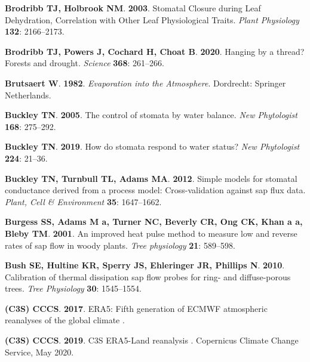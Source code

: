 \documentclass[11pt,twoside]{reedthesis}
\begin{document}
\hypertarget{ref-brodribb_stomatal_2003}{}
\textbf{\textnormal{Brodribb TJ}, \textnormal{Holbrook NM}}.
\textbf{2003}. Stomatal Closure during Leaf Dehydration, Correlation
with Other Leaf Physiological Traits. \emph{Plant Physiology}
\textbf{132}: 2166--2173.

\hypertarget{ref-Brodribb2020}{}
\textbf{\textnormal{Brodribb TJ}, \textnormal{Powers J},
\textnormal{Cochard H}, \textnormal{Choat B}}. \textbf{2020}. Hanging by
a thread? Forests and drought. \emph{Science} \textbf{368}: 261--266.

\hypertarget{ref-brutsaert_evaporation_1982}{}
\textbf{\textnormal{Brutsaert W}}. \textbf{1982}. \emph{Evaporation into
the Atmosphere}. Dordrecht: Springer Netherlands.

\hypertarget{ref-Buckley2005}{}
\textbf{\textnormal{Buckley TN}}. \textbf{2005}. The control of stomata
by water balance. \emph{New Phytologist} \textbf{168}: 275--292.

\hypertarget{ref-Buckley2019}{}
\textbf{\textnormal{Buckley TN}}. \textbf{2019}. How do stomata respond
to water status? \emph{New Phytologist} \textbf{224}: 21--36.

\hypertarget{ref-Buckley2012}{}
\textbf{\textnormal{Buckley TN}, \textnormal{Turnbull TL},
\textnormal{Adams MA}}. \textbf{2012}. Simple models for stomatal
conductance derived from a process model: Cross-validation against sap
flux data. \emph{Plant, Cell \& Environment} \textbf{35}: 1647--1662.

\hypertarget{ref-Burgess2001}{}
\textbf{\textnormal{Burgess SS}, \textnormal{Adams M a},
\textnormal{Turner NC}, \textnormal{Beverly CR}, \textnormal{Ong CK},
\textnormal{Khan a a}, \textnormal{Bleby TM}}. \textbf{2001}. An
improved heat pulse method to measure low and reverse rates of sap flow
in woody plants. \emph{Tree physiology} \textbf{21}: 589--598.

\hypertarget{ref-Bush2010}{}
\textbf{\textnormal{Bush SE}, \textnormal{Hultine KR},
\textnormal{Sperry JS}, \textnormal{Ehleringer JR}, \textnormal{Phillips
N}}. \textbf{2010}. Calibration of thermal dissipation sap flow probes
for ring- and diffuse-porous trees. \emph{Tree Physiology} \textbf{30}:
1545--1554.

\hypertarget{ref-copernicus_climate_change_service_c3s_era5_2017}{}
\textbf{\textnormal{(C3S) CCCS}}. \textbf{2017}. ERA5: Fifth generation
of ECMWF atmospheric reanalyses of the global climate .

\hypertarget{ref-copernicus_climate_change_service_c3s_c3s_2019}{}
\textbf{\textnormal{(C3S) CCCS}}. \textbf{2019}. C3S ERA5-Land
reanalysis . Copernicus Climate Change Service, May 2020.
\end{document}
